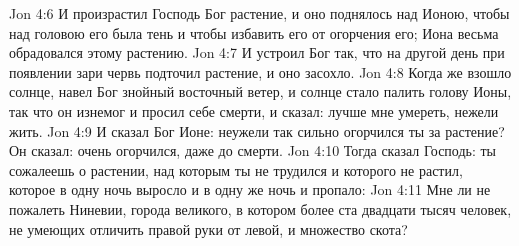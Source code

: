 \vs Jon 4:6 И произрастил Господь Бог растение, и оно поднялось над Ионою, чтобы над головою его была тень и чтобы избавить его от огорчения его; Иона весьма обрадовался этому растению.
\vs Jon 4:7 И устроил Бог так, что на другой день при появлении зари червь подточил растение, и оно засохло.
\vs Jon 4:8 Когда же взошло солнце, навел Бог знойный восточный ветер, и солнце стало палить голову Ионы, так что он изнемог и просил себе смерти, и сказал: лучше мне умереть, нежели жить.
\vs Jon 4:9 И сказал Бог Ионе: неужели так сильно огорчился ты за растение? Он сказал: очень огорчился, даже до смерти.
\vs Jon 4:10 Тогда сказал Господь: ты сожалеешь о растении, над которым ты не трудился и которого не растил, которое в одну ночь выросло и в одну же ночь и пропало:
\vs Jon 4:11 Мне ли не пожалеть Ниневии, города великого, в котором более ста двадцати тысяч человек, не умеющих отличить правой руки от левой, и множество скота?

